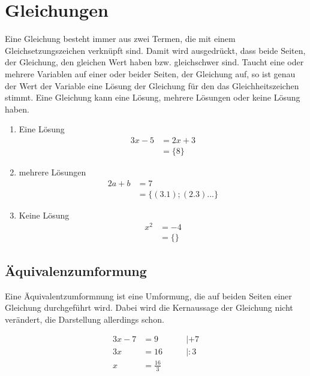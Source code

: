 \section{Gleichungen}\label{sec:Gleichungen}
 Eine Gleichung besteht immer aus zwei Termen, die mit einem Gleichsetzungszeichen verknüpft sind. Damit wird ausgedrückt, dass beide Seiten, der Gleichung, den gleichen Wert haben bzw. gleichschwer sind. Taucht eine oder mehrere Variablen auf einer oder beider Seiten, der Gleichung auf, so ist genau der Wert der Variable eine Lösung der Gleichung für den das Gleichheitszeichen stimmt. 
Eine Gleichung kann eine Lösung, mehrere Lösungen oder keine Lösung haben. 

\begin{beispiel}
	\begin{enumerate}
		\item Eine Lösung 
			\begin{align*}
				3x-5&=2x+3\\
				&=\{8\}
			\end{align*}
		\item mehrere Lösungen 
			\begin{align*}
				2a+b&=7\\
				&=\{(3.1);(2.3)...\}
			\end{align*}
		\item Keine Lösung
			\begin{align*}
				x^2&=-4\\
				&=\{\}
			\end{align*}
	\end{enumerate}
\end{beispiel}
\subsection{Äquivalenzumformung}\label{sec:Gleichungen/Aequivalenzumformung}
Eine Äquivalentzumformnung ist eine Umformung, die auf beiden Seiten einer Gleichung durchgeführt wird. Dabei wird die Kernaussage der Gleichung nicht verändert, die Darstellung allerdings schon.

\begin{beispiel}
	\begin{alignat*}
		3x-7&=9\qquad &| +7\\
		3x&=16 \qquad &|:3\\
		x&=\frac{16}{3}
	\end{alignat*}
\end{beispiel}
